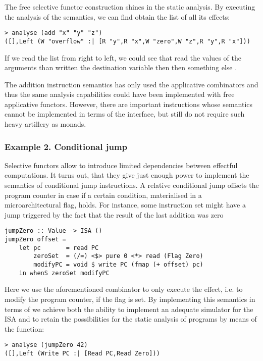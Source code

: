 The free selective functor construction shines in the static analysis. By executing
the analysis of the  semantics, we can find obtain the list of all its effects:
\begin{verbatim}
> analyse (add "x" "y" "z")
([],Left (W "overflow" :| [R "y",R "x",W "zero",W "z",R "y",R "x"]))
\end{verbatim}
If we read the list from right to left, we could see that  read the values of the
arguments than written the destination variable then then something else .

The addition instruction semantics has only used the applicative combinators and thus
the same analysis capabilities could have been implemented with free applicative functors.
However, there are important instructions whose semantics cannot be implemented in terms
of the  interface, but still do not require such heavy artillery as monads.

\subsubsection{Example 2. Conditional jump}

Selective functors allow to introduce limited dependencies between effectful computations.
It turns out, that they give just enough power to implement the semantics of conditional
jump instructions. A relative conditional jump offsets the program counter in case if a
certain condition, materialised in a microarchitectural flag, holds. For instance, some instruction set might have a jump triggered by the fact that the result of the last addition was zero

\begin{verbatim}
jumpZero :: Value -> ISA ()
jumpZero offset =
    let pc       = read PC
        zeroSet  = (/=) <$> pure 0 <*> read (Flag Zero)
        modifyPC = void $ write PC (fmap (+ offset) pc)
    in whenS zeroSet modifyPC
\end{verbatim}

Here we use the aforementioned  combinator to only execute the effect, i.e.
to modify the program counter, if the flag is set. By implementing this semantics in terms of
 we achieve both the ability to implement an adequate simulator for the ISA and
to retain the possibilities for the static analysis of programs by means of the  function:

\begin{verbatim}
> analyse (jumpZero 42)
([],Left (Write PC :| [Read PC,Read Zero]))
\end{verbatim}

